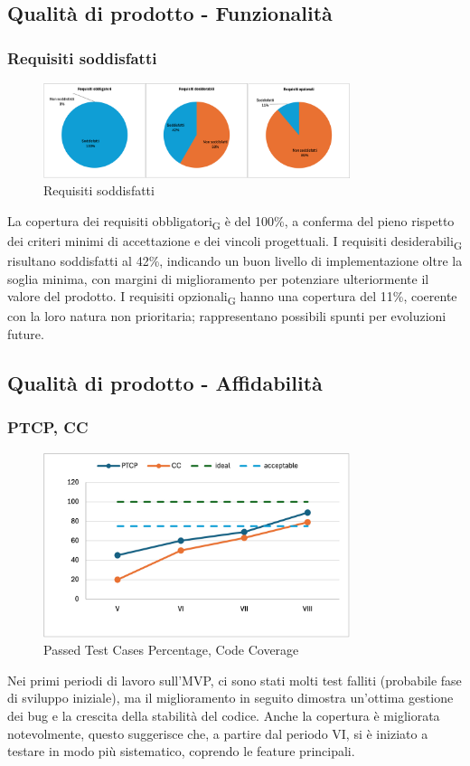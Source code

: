\subsection{Qualità di prodotto - Funzionalità}
\subsubsection{Requisiti soddisfatti}
\begin{figure}[H]
    \centering
    \includegraphics[width=0.8\textwidth]{./images/REQ.png}
    \caption{Requisiti soddisfatti}
\end{figure}
La copertura dei requisiti obbligatori\textsubscript{G} è del 100\%, a conferma del pieno rispetto dei criteri minimi di accettazione e dei vincoli progettuali.
I requisiti desiderabili\textsubscript{G} risultano soddisfatti al 42\%, indicando un buon livello di implementazione oltre la soglia minima, con margini di miglioramento per potenziare ulteriormente il valore del prodotto.
I requisiti opzionali\textsubscript{G} hanno una copertura del 11\%, coerente con la loro natura non prioritaria; rappresentano possibili spunti per evoluzioni future.

\subsection{Qualità di prodotto - Affidabilità}
\subsubsection{PTCP, CC}
\begin{figure}[H]
    \centering
    \includegraphics[width=0.8\textwidth]{./images/PTCP-CC.png}
    \caption{Passed Test Cases Percentage, Code Coverage}
\end{figure}
Nei primi periodi di lavoro sull'MVP, ci sono stati molti test falliti (probabile fase di sviluppo iniziale), ma il miglioramento in seguito dimostra un’ottima gestione dei bug e la crescita della stabilità del codice. Anche la copertura è migliorata notevolmente, questo suggerisce che, a partire dal periodo VI, si è iniziato a testare in modo più sistematico, coprendo le feature principali.